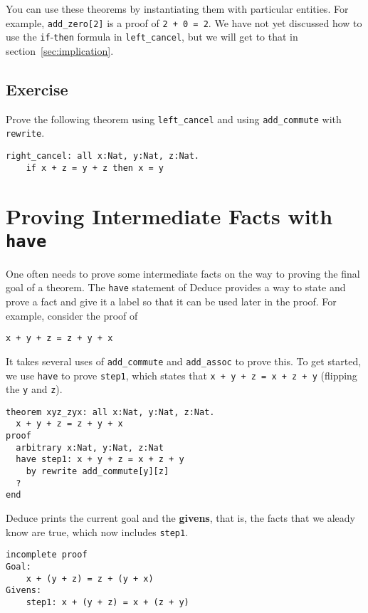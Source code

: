 \documentclass[12pt]{article}
\begin{document}
You can use these theorems by instantiating them with particular
entities. For example, \texttt{add\_zero[2]} is a proof of \texttt{2 +
  0 = 2}.  We have not yet discussed how to use the
\texttt{if}-\texttt{then} formula in \texttt{left\_cancel}, but we
will get to that in section~\ref{sec:implication}.

\subsection*{Exercise}

Prove the following theorem using \texttt{left\_cancel} and using
\texttt{add\_commute} with \texttt{rewrite}.

\begin{verbatim}
right_cancel: all x:Nat, y:Nat, z:Nat.
    if x + z = y + z then x = y
\end{verbatim}

\pagebreak

\section{Proving Intermediate Facts with \texttt{have}}

One often needs to prove some intermediate facts on the way to proving
the final goal of a theorem. The \texttt{have} statement of Deduce provides a
way to state and prove a fact and give it a label so that it can be
used later in the proof. For example, consider the proof of

\begin{verbatim}
x + y + z = z + y + x
\end{verbatim}

It takes several uses of \texttt{add\_commute} and \texttt{add\_assoc}
to prove this.  To get started, we use \texttt{have} to prove
\texttt{step1}, which states that \texttt{x + y + z = x + z + y}
(flipping the \texttt{y} and \texttt{z}).

\begin{verbatim}
theorem xyz_zyx: all x:Nat, y:Nat, z:Nat.
  x + y + z = z + y + x
proof
  arbitrary x:Nat, y:Nat, z:Nat
  have step1: x + y + z = x + z + y
    by rewrite add_commute[y][z]
  ?
end
\end{verbatim}

Deduce prints the current goal and the \textbf{givens}, that is, the
facts that we aleady know are true, which now includes \texttt{step1}.

\begin{verbatim}
incomplete proof
Goal:
    x + (y + z) = z + (y + x)
Givens:
    step1: x + (y + z) = x + (z + y)
\end{verbatim}
\end{document}
